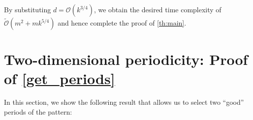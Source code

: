 \documentclass[11pt, letterpaper]{article}
\theoremstyle{plain}
\newtheorem{lemma}{Lemma}
\theoremstyle{definition}
\theoremstyle{remark}
\renewcommand{\O}{\mathcal{O}}
\newcommand{\tO}{\tilde{\mathcal{O}}}
\begin{document}
By substituting $d = \O(k^{3/4})$, we obtain the desired time complexity of $\tO(m^2 + mk^{5/4})$ and hence complete the proof of \cref{th:main}.

\section{Two-dimensional periodicity: Proof of \cref{get_periods}}
In this section, we show the following result that allows us to select two ``good'' periods of the pattern:

\GetPeriods
\end{document}
